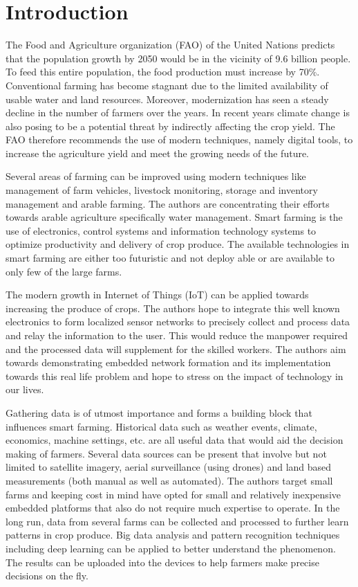 \documentclass{sig-alternate-05-2015}
\begin{document}


\section{Introduction}
The Food and Agriculture organization (FAO) of the United Nations predicts that the population growth by 2050 would be in the vicinity of 9.6 billion people\cite{fao:fao1}. To feed this entire population, the food production must increase by 70\%\cite{fao:fao1}. Conventional farming has become stagnant due to the limited availability of usable water and land resources. Moreover, modernization has seen a steady decline in the number of farmers over the years. In recent years climate change is also posing to be a potential threat by indirectly affecting the crop yield. The FAO therefore recommends the use of modern techniques, namely digital tools, to increase the agriculture yield and meet the growing needs of the future.

Several areas of farming can be improved using modern techniques like management of farm vehicles, livestock monitoring, storage and inventory management and arable farming. The authors are concentrating their efforts towards arable agriculture specifically water management. 
Smart farming is the use of electronics, control  systems  and information technology systems to  optimize productivity and  delivery  of  crop produce. The available technologies in smart farming are either too futuristic and not deploy able or are available to only few of the large farms.

The modern growth in Internet of Things (IoT) can be applied towards increasing the produce of crops\cite{bcm:bcm1}. The authors hope to integrate this well known electronics to form localized sensor networks to precisely collect and process data and relay the information to the user. This would reduce the manpower required and the processed data will supplement for the skilled workers. The authors aim towards demonstrating embedded network formation and its implementation towards this real life problem and hope to stress on the impact of technology in our lives.

Gathering data is of utmost importance and forms a building block that influences smart farming. Historical data such as weather events, climate, economics, machine settings, etc. are all useful data that would aid the decision making of farmers. Several data sources can be present that involve but not limited to satellite imagery, aerial surveillance (using drones) and land based measurements (both manual as well as automated). The authors target small farms and keeping cost in mind have opted for small and relatively inexpensive embedded platforms that also do not require much expertise to operate.
In the long run, data from several farms can be collected and processed to further learn patterns in crop produce. Big data analysis and pattern recognition techniques including deep learning can be applied to better understand the phenomenon. The results can be uploaded into the devices to help farmers make precise decisions on the fly.
\end{document}
